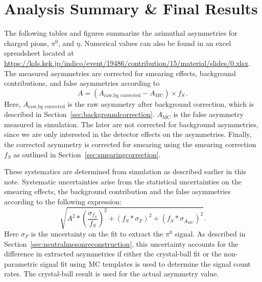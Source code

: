 \section{Analysis Summary \& Final Results}

The following tables and figures summarize the azimuthal asymmetries for charged pions, $\pi^0$, and $\eta$. 
Numerical values can also be found in an excel spreadsheet located at
\url{https://kds.kek.jp/indico/event/19486/contribution/15/material/slides/0.xlsx}.
The measured asymmetries are corrected for smearing effects, background contributions, and false asymmetries according to
\begin{equation}
A=(A_\textrm{raw,bg corrected}-A_\textrm{MC})\times f_S\, .
\end{equation}
Here, $A_\textrm{raw,bg corrected}$ is the raw asymmetry after background correction, which is described in Section~\ref{sec:backgroundcorrection}.
$A_\textrm{MC}$ is the false asymmetry measured in simulation. The later are not corrected for background asymmetries, since we are only interested in the detector effects on the asymmetries.
Finally, the corrected asymmetry is corrected for smearing using the smearing correction $f_S$ as outlined in Section~\ref{sec:smearingcorrection}.

These systematics are determined from simulation as described earlier in this note. Systematic uncertainties arise from the statistical uncertainties on the smearing effects, the background contribution and the false asymmetries according to the following expression:
\begin{equation}
\sqrt{ A^2*(\frac{\sigma_{f_S}}{f_S})^2+(f_S*\sigma_F)^2+(f_S*\sigma_{A_\textrm{MC}})^2}.
 \end{equation}
 Here $\sigma_F$ is the uncertainty on the fit to extract the $\pi^0$ signal. As described in Section~\ref{sec:neutralmesonreconstruction}, this uncertainty accounts for the difference in extracted asymmetries if either the crystal-ball fit or the non-parametric signal fit using MC templates is used to determine the signal count rates. The crystal-ball result is used for the actual asymmetry value.
 
